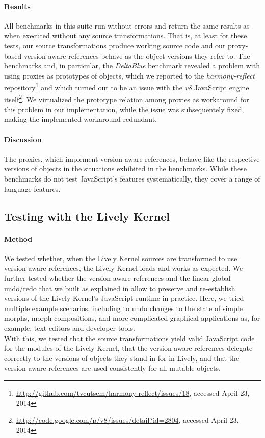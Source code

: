 \paragraph{Results}
All benchmarks in this suite run without errors and return the same results as when executed without any source transformations.
That is, at least for these tests, our source transformations produce working source code and our proxy-based version-aware references behave as the object versions they refer to.
The benchmarks and, in particular, the \emph{DeltaBlue} benchmark revealed a problem with using proxies as prototypes of objects, which we reported to the \emph{harmony-reflect} repository\footnote{\url{http://github.com/tvcutsem/harmony-reflect/issues/18}, accessed April 23, 2014} and which turned out to be an issue with the \emph{v8} JavaScript engine itself\footnote{\url{http://code.google.com/p/v8/issues/detail?id=2804}, accessed April 23, 2014}.
We virtualized the prototype relation among proxies as workaround for this problem in our implementation, while the issue was subsequentely fixed, making the implemented workaround redundant.

\paragraph{Discussion}
The proxies, which implement version-aware references, behave like the respective versions of objects in the situations exhibited in the benchmarks.
While these benchmarks do not test JavaScript's features systematically, they cover a range of language features.


\subsection{Testing with the Lively Kernel}

\paragraph{Method}
We tested whether, when the Lively Kernel sources are transformed to use version-aware references, the Lively Kernel loads and works as expected.
We further tested whether the version-aware references and the linear global undo/redo that we built as explained in  allow to preserve and re-establish versions of the Lively Kernel's JavaScript runtime in practice.
Here, we tried multiple example scenarios, including to undo changes to the state of simple morphs, morph compositions, and more complicated graphical applications as, for example, text editors and developer tools.\\
With this, we tested that the source transformations yield valid JavaScript code for the modules of the Lively Kernel, that the version-aware references delegate correctly to the versions of objects they stand-in for in Lively, and that the version-aware references are used consistently for all mutable objects.


